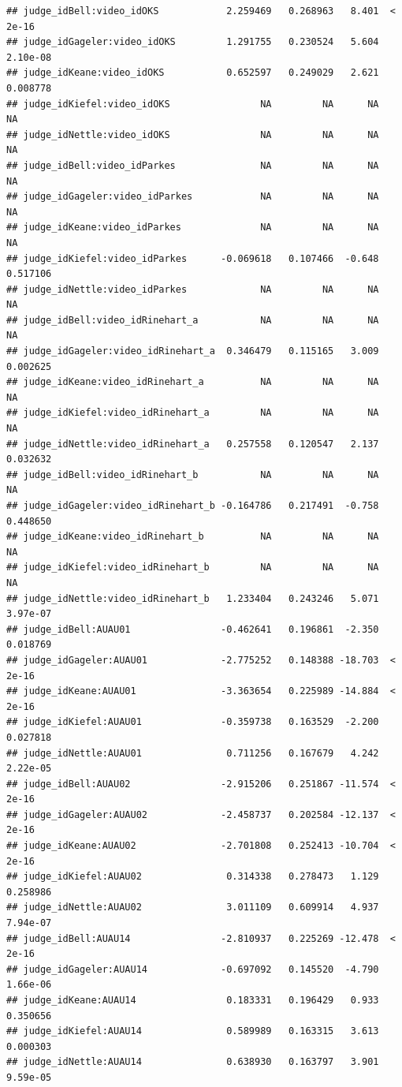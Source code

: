 \documentclass{monashthesis}
\begin{document}
\begin{verbatim}
## judge_idBell:video_idOKS            2.259469   0.268963   8.401  < 2e-16
## judge_idGageler:video_idOKS         1.291755   0.230524   5.604 2.10e-08
## judge_idKeane:video_idOKS           0.652597   0.249029   2.621 0.008778
## judge_idKiefel:video_idOKS                NA         NA      NA       NA
## judge_idNettle:video_idOKS                NA         NA      NA       NA
## judge_idBell:video_idParkes               NA         NA      NA       NA
## judge_idGageler:video_idParkes            NA         NA      NA       NA
## judge_idKeane:video_idParkes              NA         NA      NA       NA
## judge_idKiefel:video_idParkes      -0.069618   0.107466  -0.648 0.517106
## judge_idNettle:video_idParkes             NA         NA      NA       NA
## judge_idBell:video_idRinehart_a           NA         NA      NA       NA
## judge_idGageler:video_idRinehart_a  0.346479   0.115165   3.009 0.002625
## judge_idKeane:video_idRinehart_a          NA         NA      NA       NA
## judge_idKiefel:video_idRinehart_a         NA         NA      NA       NA
## judge_idNettle:video_idRinehart_a   0.257558   0.120547   2.137 0.032632
## judge_idBell:video_idRinehart_b           NA         NA      NA       NA
## judge_idGageler:video_idRinehart_b -0.164786   0.217491  -0.758 0.448650
## judge_idKeane:video_idRinehart_b          NA         NA      NA       NA
## judge_idKiefel:video_idRinehart_b         NA         NA      NA       NA
## judge_idNettle:video_idRinehart_b   1.233404   0.243246   5.071 3.97e-07
## judge_idBell:AUAU01                -0.462641   0.196861  -2.350 0.018769
## judge_idGageler:AUAU01             -2.775252   0.148388 -18.703  < 2e-16
## judge_idKeane:AUAU01               -3.363654   0.225989 -14.884  < 2e-16
## judge_idKiefel:AUAU01              -0.359738   0.163529  -2.200 0.027818
## judge_idNettle:AUAU01               0.711256   0.167679   4.242 2.22e-05
## judge_idBell:AUAU02                -2.915206   0.251867 -11.574  < 2e-16
## judge_idGageler:AUAU02             -2.458737   0.202584 -12.137  < 2e-16
## judge_idKeane:AUAU02               -2.701808   0.252413 -10.704  < 2e-16
## judge_idKiefel:AUAU02               0.314338   0.278473   1.129 0.258986
## judge_idNettle:AUAU02               3.011109   0.609914   4.937 7.94e-07
## judge_idBell:AUAU14                -2.810937   0.225269 -12.478  < 2e-16
## judge_idGageler:AUAU14             -0.697092   0.145520  -4.790 1.66e-06
## judge_idKeane:AUAU14                0.183331   0.196429   0.933 0.350656
## judge_idKiefel:AUAU14               0.589989   0.163315   3.613 0.000303
## judge_idNettle:AUAU14               0.638930   0.163797   3.901 9.59e-05

\end{verbatim}
\end{document}
